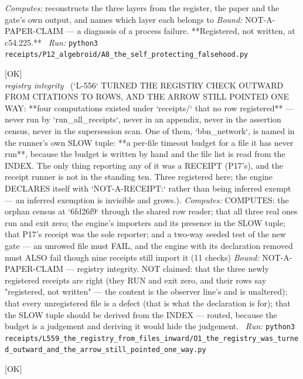 \begin{description}
\emph{Computes:} reconstructs the three layers from the register, the paper and the gate's own output, and names which layer each belongs to
 \emph{Bound:} NOT-A-PAPER-CLAIM --- a diagnosis of a process failure. **Registered, not written, at c54.225.**
\ \emph{Run:} \texttt{python3 receipts/P12\_algebroid/A8\_the\_self\_protecting\_falsehood.py}
\item[\label{rcpt:O1_the_registry_was_turned_outward_and_the_arrow_still_pointed_one_way}\texttt{O1\_the\_registry\_was\_turned\_outward\_and\_the\_arrow\_still\_pointed\_one\_way}]\hfill\textsf{[OK]}\\
\textit{registry integrity} \ (`L-556` TURNED THE REGISTRY CHECK OUTWARD FROM CITATIONS TO ROWS, AND THE ARROW STILL POINTED ONE WAY: **four computations existed under `receipts/` that no row registered** --- never run by `run\_all\_receipts`, never in an appendix, never in the assertion census, never in the supersession scan. One of them, `bbn\_network`, is named in the runner's own SLOW tuple: **a per-file timeout budget for a file it has never run**, because the budget is written by hand and the file list is read from the INDEX. The only thing reporting any of it was a RECEIPT (P17's), and the receipt runner is not in the standing ten. Three registered here; the engine DECLARES itself with `NOT-A-RECEIPT:` rather than being inferred exempt --- an inferred exemption is invisible and grows.). 
\emph{Computes:} COMPUTES: the orphan census at `6fd26f9` through the shared row reader; that all three real ones run and exit zero; the engine's importers and its presence in the SLOW tuple; that P17's receipt was the sole reporter; and a two-way seeded test of the new gate --- an unrowed file must FAIL, and the engine with its declaration removed must ALSO fail though nine receipts still import it (11 checks)
 \emph{Bound:} NOT-A-PAPER-CLAIM --- registry integrity. NOT claimed: that the three newly registered receipts are right (they RUN and exit zero, and their rows say "registered, not written" --- the content is the observer line's and is unaltered); that every unregistered file is a defect (that is what the declaration is for); that the SLOW tuple should be derived from the INDEX --- routed, because the budget is a judgement and deriving it would hide the judgement.
\ \emph{Run:} \texttt{python3 receipts/L559\_the\_registry\_from\_files\_inward/O1\_the\_registry\_was\_turned\_outward\_and\_the\_arrow\_still\_pointed\_one\_way.py}
\item[\label{rcpt:P1_the_last_five_failures_were_pins_into_prose_that_later_correct_work_moved}\texttt{P1\_the\_last\_five\_failures\_were\_pins\_into\_prose\_that\_later\_correct\_work\_moved}]\hfill\textsf{[OK]}\\

\end{description}
